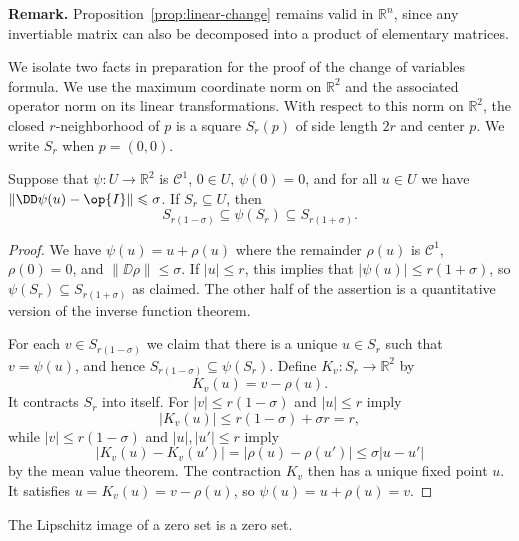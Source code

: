 \documentclass[11pt]{article}
\begin{document}
\noindent\textbf{Remark.} Proposition~\ref{prop:linear-change} remains valid in $\mathbb{R}^n$, since any invertiable matrix can also be decomposed into a product of elementary matrices.

\medskip

We isolate two facts in preparation for the proof of the change of variables formula.  We use the maximum coordinate norm on $\mathbb{R}^2$ and the associated operator norm on its linear transformations.  With respect to this norm on $\mathbb{R}^2$, the closed $r$-neighborhood of $p$ is a square $S_r(p)$ of side length $2r$ and center $p$.  We write $S_r$ when $p = (0,0)$.

\begin{lem}
  \label{lem:34}
  Suppose that $\psi: U \to \mathbb{R}^2$ is $\mathcal{C}^1$, $0 \in U$, $\psi(0) = 0$, and for all $u \in U$ we have $\| \DD \psi(u) - \op{I} \| \leqslant \sigma$.  If $S_r \subseteq U$, then
  \[
    S_{r(1-\sigma)} \subseteq \psi(S_r) \subseteq S_{r(1+\sigma)}.
  \]
\end{lem}

\begin{proof}
  We have $\psi(u) = u + \rho(u)$ where the remainder $\rho(u)$ is $\mathcal{C}^1$, $\rho(0) = 0$, and $\| \DD \rho \| \leqslant \sigma$.  If $|u| \leqslant r$, this implies that $|\psi(u)| \leqslant r (1 + \sigma)$, so $\psi(S_r) \subseteq S_{r(1+\sigma)}$ as claimed.  The other half of the assertion is a quantitative version of the inverse function theorem.

  For each $v \in S_{r(1-\sigma)}$ we claim that there is a unique $u \in S_r$ such that $v = \psi(u)$, and hence $S_{r(1-\sigma)} \subseteq \psi(S_r)$.  Define $K_v: S_r \to \mathbb{R}^2$ by
  \[
    K_v(u) = v - \rho(u).
  \]
  It contracts $S_r$ into itself.  For $|v| \leqslant r(1-\sigma)$ and $|u| \leqslant r$ imply
  \[
    |K_v(u)| \leqslant r(1-\sigma) + \sigma r = r,
  \]
  while $|v| \leqslant r(1-\sigma)$ and $|u|, |u'| \leqslant r$ imply
  \[
    |K_v(u) - K_v(u')| = |\rho(u) - \rho(u')| \leqslant \sigma |u - u'|
  \]
  by the mean value theorem.  The contraction $K_v$ then has a unique fixed point $u$.  It satisfies $u = K_v(u) = v - \rho(u)$, so $\psi(u) = u + \rho(u) = v$.
\end{proof}

\begin{lem}
  \label{lem:35}
  The Lipschitz image of a zero set is a zero set.
\end{lem}
\end{document}
